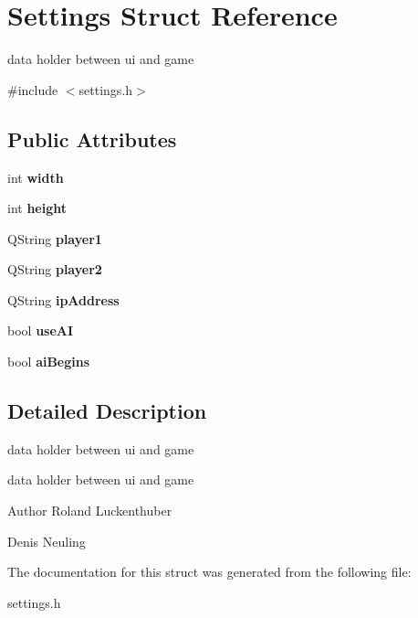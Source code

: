 \hypertarget{structSettings}{\section{\-Settings \-Struct \-Reference}
\label{structSettings}
}


data holder between ui and game  




{\ttfamily \#include $<$settings.\-h$>$}

\subsection*{\-Public \-Attributes}
\begin{DoxyCompactItemize}
\item 
\hypertarget{structSettings_ac5a707ab0e620e9aeb22d98478197506}{int {\bfseries width}}\label{structSettings_ac5a707ab0e620e9aeb22d98478197506}

\item 
\hypertarget{structSettings_af63a2c25f93b1f54a88f9217e95fbcc0}{int {\bfseries height}}\label{structSettings_af63a2c25f93b1f54a88f9217e95fbcc0}

\item 
\hypertarget{structSettings_a02c5d891df66d91711d7ef348bc0a98a}{\-Q\-String {\bfseries player1}}\label{structSettings_a02c5d891df66d91711d7ef348bc0a98a}

\item 
\hypertarget{structSettings_af36a424cc1c71f670f4e0b221f1ac2d4}{\-Q\-String {\bfseries player2}}\label{structSettings_af36a424cc1c71f670f4e0b221f1ac2d4}

\item 
\hypertarget{structSettings_a5dd01adc93a126d0c4443b9e04906388}{\-Q\-String {\bfseries ip\-Address}}\label{structSettings_a5dd01adc93a126d0c4443b9e04906388}

\item 
\hypertarget{structSettings_a0d2542ef361af07d3a52243c46305541}{bool {\bfseries use\-A\-I}}\label{structSettings_a0d2542ef361af07d3a52243c46305541}

\item 
\hypertarget{structSettings_aa510d772b330cc005608bb764d8aaf2b}{bool {\bfseries ai\-Begins}}\label{structSettings_aa510d772b330cc005608bb764d8aaf2b}

\end{DoxyCompactItemize}


\subsection{\-Detailed \-Description}
data holder between ui and game 

data holder between ui and game

\begin{DoxyAuthor}{\-Author}
\-Roland \-Luckenthuber 

\-Denis \-Neuling 
\end{DoxyAuthor}


\-The documentation for this struct was generated from the following file\-:\begin{DoxyCompactItemize}
\item 
settings.\-h\end{DoxyCompactItemize}
